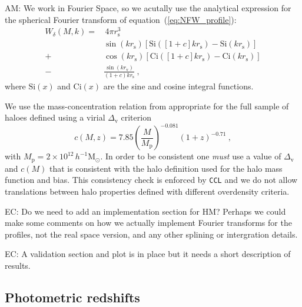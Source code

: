 \documentclass[\docopts]{\docclass}
\newcommand{\elisa}[1]{\textcolor{green!10!orange!90!}{EC: #1}}
\newcommand{\Mead}[1]{\textcolor{red!50!cyan}{AM: #1}}
\newcommand{\ccl}{{\tt CCL}\xspace}
\begin{document}
\Mead{We work in Fourier Space, so we acutally use the analytical expression for the spherical Fourier transform of equation~(\ref{eq:NFW_profile}):
\begin{equation}
\begin{split}
W_\delta(M,k) = &\, 4\pi r_\mathrm{s}^3 \\%
& \sin(kr_\mathrm{s})\left[\mathrm{Si}([1+c]kr_\mathrm{s})-\mathrm{Si}(kr_\mathrm{s})\right] \\
+ & \cos(kr_\mathrm{s})\left[\mathrm{Ci}([1+c]kr_\mathrm{s})-\mathrm{Ci}(kr_\mathrm{s})\right] \\
- & \frac{\sin(kr_\mathrm{v})}{(1+c)kr_\mathrm{s}}\ ,%
\label{eq:NFW_Fourier}
\end{split}
\end{equation}
where $\mathrm{Si}(x)$ and $\mathrm{Ci}(x)$ are the sine and cosine integral functions.}

We use the mass-concentration relation from \cite{Duffy2008} appropriate for the full sample of haloes defined using a virial $\Delta_\mathrm{v}$ criterion
\begin{equation}
c(M,z)=7.85\left(\frac{M}{M_\mathrm{p}}\right)^{-0.081}(1+z)^{-0.71}\ ,
\end{equation}
with $M_\mathrm{p}=2\times10^{12}\,h^{-1}\mathrm{M}_\odot$.
In order to be consistent one \emph{must} use a value of $\Delta_\mathrm{v}$ and $c(M)$ that is consistent with the halo definition used for the halo mass function and bias. This consistency check is enforced by \ccl and we do not allow translations between halo properties defined with different overdensity criteria.

\elisa{Do we need to add an implementation section for HM? Perhaps we could make some comments on how we actually implement Fourier transforms for the profiles, not the real space version, and any other splining or intergration details.}

\elisa{A validation section and plot is in place but it needs a short description of results.}

\subsection{Photometric redshifts}
\end{document}

